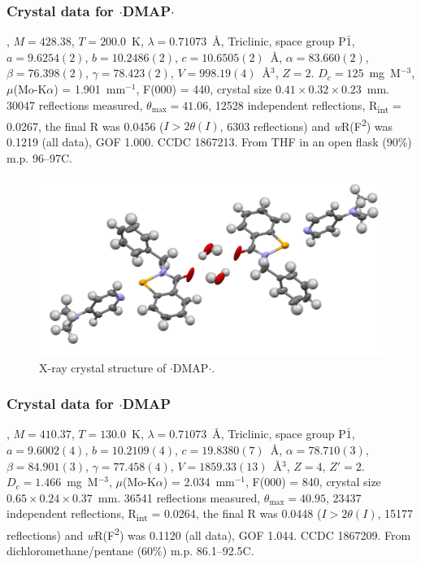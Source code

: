 \begin{refsection}
    \subsubsection{Crystal data for \texorpdfstring{$ \cdot $DMAP$ \cdot $}{C21H21N3OSe.(H2O)}}
    , $M=428.38$, $T=200.0$~K, $ \lambda=0.71073 $~\AA, Triclinic, space group P$\bar{1}$, $a = 9.6254(2)$, $b = 10.2486(2)$, $c = 10.6505(2)$~\AA, $\alpha = 83.660(2)$\degree, $\beta = 76.398(2)$\degree, $\gamma = 78.423(2)$\degree, $V = 998.19(4)$~\AA$^{3}$, $Z = 2$.
    $D_{c}= 125$~mg~M$^{-3}$, $\mu$(Mo-K$\alpha$) = 1.901~mm$^{-1}$, F(000) = 440, crystal size $0.41 \times 0.32 \times 0.23$~mm.
    30047 reflections measured, $\theta_{\max} = 41.06$\degree, 12528 independent reflections, R\textsubscript{int} = 0.0267, the final R was 0.0456 ($I > 2\theta(I)$, 6303 reflections) and \textit{w}R(F\textsuperscript{2}) was 0.1219 (all data), GOF 1.000.
    CCDC 1867213.
    From THF in an open flask (90\%) m.p. 96--97\degree{}C.
    
    \begin{figure}
      \includegraphics[width=0.6\linewidth]{Figures/ebs-bn-dmap-hydrate-xtal.pdf}
      \caption{X-ray crystal structure of \texorpdfstring{$ \cdot $DMAP$ \cdot $}{C21H21N3OSe.(H2O)}.}
    \end{figure}
    
    \subsubsection{Crystal data for \texorpdfstring{$ \cdot $DMAP}{C21H21N3OSe}}
    , $M=410.37$, $T=130.0$~K, $ \lambda=0.71073 $~\AA, Triclinic, space group P$\bar{1}$, $a = 9.6002(4)$, $b = 10.2109(4)$, $c = 19.8380(7)$~\AA, $\alpha = 78.710(3)$\degree, $\beta = 84.901(3)$\degree, $\gamma = 77.458(4)$\degree, $V = 1859.33(13)$~\AA$^{3}$, $Z = 4$, $Z\prime = 2$.
    $D_{c}= 1.466$~mg~M$^{-3}$, $\mu$(Mo-K$\alpha$) = 2.034~mm$^{-1}$, F(000) = 840, crystal size $0.65 \times 0.24 \times 0.37$~mm.
    36541 reflections measured, $\theta_{\max} = 40.95$\degree, 23437 independent reflections, R\textsubscript{int} = 0.0264, the final R was 0.0448 ($I > 2\theta(I)$, 15177 reflections) and \textit{w}R(F\textsuperscript{2}) was 0.1120 (all data), GOF 1.044.
    CCDC 1867209.
    From dichloromethane/pentane (60\%) m.p. 86.1--92.5\degree{}C.
    

\end{refsection}
